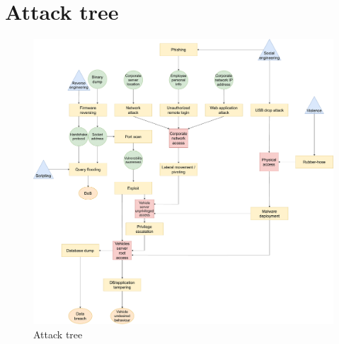 %
\chapter{Attack tree}\label{ch:attackTree}


\begin{figure}[H]
    \begin{center}
        \includegraphics[scale=0.3]{img/attackTree.pdf}
        \caption{Attack tree}
        \label{fig:attackTree}
    \end{center}
    \vspace*{-0.4cm}
\end{figure}